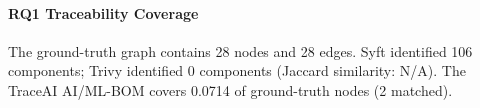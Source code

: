 \paragraph{RQ1 Traceability Coverage}
The ground-truth graph contains 28 nodes and 28 edges. 
Syft identified 106 components; Trivy identified 0 components (Jaccard similarity: N/A). 
The TraceAI AI/ML-BOM covers 0.0714 of ground-truth nodes (2 matched).